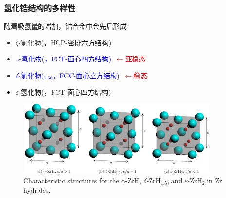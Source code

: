 \begin{frame}
	\frametitle{氢化锆结构的多样性}
随着吸氢量的增加，锆合金中会先后形成
\begin{itemize}
	\item $\zeta$-氢化物\textrm{(，HCP-密排六方结构)}
	\item \textcolor{blue}{$\gamma$-氢化物\textrm{(，FCT-面心四方结构)}}~\textcolor{red}{$\leftarrow$亚稳态}
	\item \textcolor{blue}{$\delta$-氢化物\textrm{($_{1.66}$，FCC-面心立方结构)}}~\textcolor{red}{$\leftarrow$稳态}
	\item $\varepsilon$-氢化物\textrm{(，FCT-面心四方结构)}
\end{itemize}
\begin{figure}[!ht]
\centering
\vspace*{-0.05in}
\includegraphics[height=1.50in,width=4.00in,viewport=0 0 1681 640,clip]{Figures/Characteristic_structures-for-the_ZrH_ZrH1.5_and_ZrH2-in-Zr_hydrides.png}
\caption{\tiny \textrm{Characteristic structures for the $\gamma$-ZrH, $\delta$-$\mathrm{ZrH}_{1.5}$, and $\varepsilon$-$\mathrm{ZrH}_2$ in Zr hydrides.}}
\label{Fig:Characteristic_structures-for-the_𝛾-ZrH_𝛿-ZrH1.5_and_𝜀-ZrH2-in-Zr_hydrides}
\end{figure}
\end{frame}


